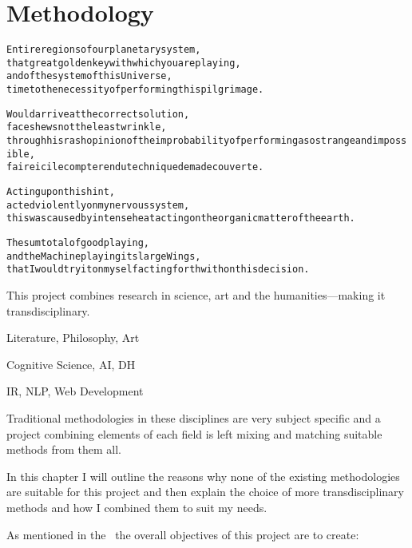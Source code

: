 
\chapter{Methodology}
\label{ch:methodology}

\startcontents[chapters]

\vfill

\begin{alltt}\sffamily
Entire regions of our planetary system,
that great golden key with which you are playing,
and of the system of this Universe,
time to the necessity of performing this pilgrimage.

Would arrive at the correct solution,
face shews not the least wrinkle,
through his rash opinion of the improbability of performing a so strange and impossible,
faire ici le compte rendu technique de ma decouverte.

Acting upon this hint,
acted violently on my nervous system,
this was caused by intense heat acting on the organic matter of the earth.

The sum total of good playing,
and the Machine playing its large Wings,
that I would try it on myself acting forthwith on this decision.
\end{alltt}

\newpage
\minicontents
\spirals


This project combines research in science, art and the humanities---making it transdisciplinary.

\begin{description}[leftmargin=3cm]
  \item [Pataphysics] Literature, Philosophy, Art
  \item [Creativity] Cognitive Science, \ac{AI}, \ac{DH}
  \item [Technology] \ac{IR}, \ac{NLP}, Web Development
\end{description}

Traditional methodologies in these disciplines are very subject specific and a project combining elements of each field is left mixing and matching suitable methods from them all.

In this chapter I will outline the reasons why none of the existing methodologies are suitable for this project and then explain the choice of more transdisciplinary methods and how I combined them to suit my needs.

As mentioned in the~ the overall objectives of this project are to create:

